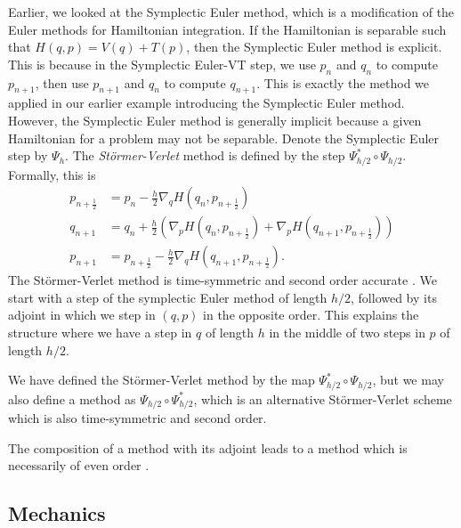 Earlier, we looked at the Symplectic Euler method, which is a modification of the Euler methods for Hamiltonian integration.
If the Hamiltonian is separable such that $H(q,p) = V(q) + T(p)$, then the Symplectic Euler method is explicit.
This is because in the Symplectic Euler-VT step, we use $p_n$ and $q_n$ to compute $p_{n+1}$, then use $p_{n+1}$ and $q_n$ to compute $q_{n+1}$.
This is exactly the method we applied in our earlier example introducing the Symplectic Euler method.
However, the Symplectic Euler method is generally implicit because a given Hamiltonian for a problem may not be separable.
Denote the Symplectic Euler step by $\Psi_h$. The \textit{St\"ormer-Verlet} method \cite{gni2006, Casas_2016} is defined by the step $\Psi_{h/2}^* \circ \Psi_{h/2}$.
Formally, this is
\begin{align*}
	p_{n+\frac{1}{2}} &= p_n - \frac{h}{2}\nabla_q H \left( q_n, p_{n+\frac{1}{2}} \right) \\
	q_{n+1} &= q_n + \frac{h}{2}\left( \nabla_p H \left( q_n, p_{n+\frac{1}{2}} \right) + \nabla_p H \left(q_{n+1}, p_{n+\frac{1}{2}} \right) \right) \\
	p_{n+1} &= p_{n+\frac{1}{2}} - \frac{h}{2} \nabla_q H \left( q_{n+1}, p_{n+\frac{1}{2}} \right).
\end{align*}
The St\"ormer-Verlet method is time-symmetric and second order accurate \cite{Casas_2016}.
We start with a step of the symplectic Euler method of length $h/2$, followed by its adjoint in which we step in $(q,p)$ in the opposite order.
This explains the structure where we have a step in $q$ of length $h$ in the middle of two steps in $p$ of length $h/2$.

We have defined the St\"ormer-Verlet method by the map $\Psi_{h/2}^* \circ \Psi_{h/2}$,
but we may also define a method as $\Psi_{h/2} \circ \Psi_{h/2}^*$,
which is an alternative St\"ormer-Verlet scheme which is also time-symmetric and second order.

The composition of a method with its adjoint leads to a method which is necessarily of even order \cite{sanz2018hamiltonian, hairerwanner1993, Casas_2016}.

\subsection{Mechanics}

